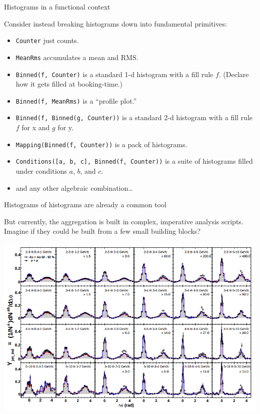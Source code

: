 \documentclass{beamer}
\begin{document}
\begin{frame}{Histograms in a functional context}

Consider instead breaking histograms down into fundamental primitives:
\begin{itemize}
\item {\tt Counter} just counts.
\item {\tt MeanRms} accumulates a mean and RMS.
\item {\tt Binned(f, Counter)} is a standard 1-d histogram with a fill rule $f$. (Declare how it gets filled at booking-time.)
\item {\tt Binned(f, MeanRms)} is a ``profile plot.''
\item {\tt Binned(f, Binned(g, Counter))} is a standard 2-d histogram with a fill rule $f$ for x and $g$ for y.
\item {\tt Mapping(Binned(f, Counter))} is a pack of histograms.
\item {\tt Conditions([a, b, c], Binned(f, Counter))} is a suite of histograms filled under conditions $a$, $b$, and $c$.
\item and any other algebraic combination\ldots
\end{itemize}
\end{frame}

\begin{frame}{Histograms of histograms are already a common tool}

But currently, the aggregation is built in complex, imperative analysis scripts. Imagine if they could be built from a few small building blocks?

\includegraphics[width=\linewidth]{histograms_of_histograms.png}
\end{frame}
\end{document}
